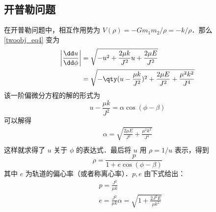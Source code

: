 \subsection{开普勒问题}
在开普勒问题中，相互作用势为 $V(\rho)=-Gm_1m_2/\rho=-k/\rho$．那么 \autoref{twoobj_eq4} 变为
\begin{equation}
\begin{aligned}
\left|\frac{\dd u}{\dd \phi}\right|&=\sqrt{-u^2+\frac{2\mu k}{J^2}u+\frac{2\mu E}{J^2}}\\
&=\sqrt{-\qty(u-\frac{\mu k}{J^2})^2+\frac{2\mu E}{J^2}+\frac{\mu^2 k^2}{J^4}}
\end{aligned}
\end{equation}
该一阶偏微分方程的解的形式为
\begin{equation}
u-\frac{\mu k}{J^2}=\alpha\cos(\phi-\beta)
\end{equation}
可以解得
\begin{equation}
\begin{aligned}
\alpha=\sqrt{\frac{2\mu E}{J^2}+\frac{\mu^2 k^2}{J^4}}\\
\end{aligned}
\end{equation}
这样就求得了 $u$ 关于 $\phi$ 的表达式．最后将 $u$ 用 $\rho=1/u$ 表示，得到
\begin{equation}
\rho=\frac{p}{1+e\cos(\phi-\beta)}
\end{equation}
其中 $e$ 为轨道的偏心率（或者称离心率）．$p,e$ 由下式给出：
\begin{equation}
\begin{aligned}
&p=\frac{J^2}{\mu k}\\
&e=\frac{J^2}{\mu k}\alpha=\sqrt{1+\frac{2J^2E}{\mu k^2}}
\end{aligned}
\end{equation}